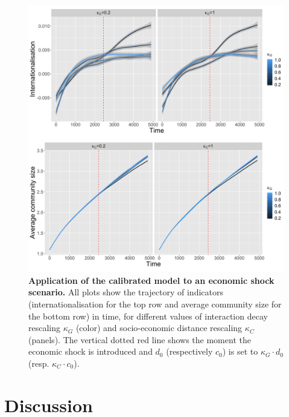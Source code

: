\documentclass[10pt,letterpaper]{article}
\begin{document}
\begin{figure}
	\begin{center}
    \includegraphics[width=\linewidth]{figures/Fig9.png}
    \end{center}
    \vspace{2cm}
	\caption{\textbf{Application of the calibrated model to an economic shock scenario.} All plots show the trajectory of indicators (internationalisation for the top row and average community size for the bottom row) in time, for different values of interaction decay rescaling $\kappa_G$ (color) and socio-economic distance rescaling $\kappa_C$ (panels). The vertical dotted red line shows the moment the economic shock is introduced and $d_0$ (respectively $c_0$) is set to $\kappa_G \cdot d_0$ (resp. $\kappa_C \cdot c_0$).\label{fig:fig9}}
\end{figure}



\section*{Discussion}
\end{document}
